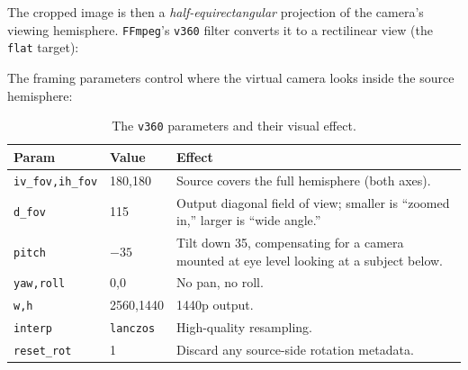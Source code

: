 \documentclass[11pt,a4paper]{article}
\begin{document}
\noindent
The cropped image is then a \emph{half-equirectangular} projection of
the camera's viewing hemisphere. \texttt{FFmpeg}'s \texttt{v360} filter
converts it to a rectilinear view (the \texttt{flat} target):

\vspace{0.4em}
\begin{center}
\end{center}
\vspace{0.4em}

\noindent
The framing parameters control where the virtual camera looks inside
the source hemisphere:

\begin{table}[h]
\centering
\renewcommand{\arraystretch}{1.25}
\begin{tabular}{llp{8cm}}
\toprule
\textbf{Param} & \textbf{Value} & \textbf{Effect} \\
\midrule
\texttt{iv\_fov,ih\_fov} & 180,180 & Source covers the full hemisphere
(both axes). \\
\texttt{d\_fov} & 115 & Output diagonal field of view; smaller is
``zoomed in,'' larger is ``wide angle.'' \\
\texttt{pitch} & $-35$ & Tilt down 35\textdegree{}, compensating for a
camera mounted at eye level looking at a subject below. \\
\texttt{yaw,roll} & 0,0 & No pan, no roll. \\
\texttt{w,h} & 2560,1440 & 1440p output. \\
\texttt{interp} & \texttt{lanczos} & High-quality resampling. \\
\texttt{reset\_rot} & 1 & Discard any source-side rotation metadata. \\
\bottomrule
\end{tabular}
\caption{The \texttt{v360} parameters and their visual effect.}
\end{table}
\end{document}
